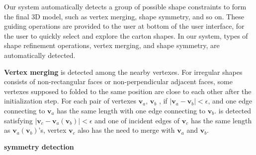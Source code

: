 
Our system  automatically detects a group of possible shape constraints to form the final 3D model, such as vertex merging, shape symmetry, and so on. 
%
These guiding operations are provided to the user at bottom of the user interface, for the user to quickly select and explore the carton shapes.
In our system,  types of shape refinement operations, vertex merging, and shape symmetry, are automatically detected.

%

\noindent
\textbf{Vertex merging} is detected among the nearby vertexes. 
For irregular shapes consists of non-rectangular faces or non-perpendicular adjacent faces, some vertexes supposed to folded to the same position are close to each other after the initialization step. 
For each pair of vertexes $\mathbf{v}_a$, $\mathbf{v}_b$ {\color{blue}{that in the nonadjacent face}}, if $|\mathbf{v}_a-\mathbf{v}_b|<\epsilon$, and one edge connecting to $\mathbf{v}_a$ has the same length with one edge connecting to $\mathbf{v}_b$.
{ is detected satisfying $|\mathbf{v}_c-\mathbf{v}_a(\mathbf{v}_b)|<\epsilon$ and one of incident edges of $\mathbf{v}_c$ has the same length as $\mathbf{v}_a(\mathbf{v}_b)$'s, vertex $\mathbf{v}_c$ also has the need to merge with $\mathbf{v}_a$ and $\mathbf{v}_b$.}


\noindent
\textbf{symmetry detection} {}

